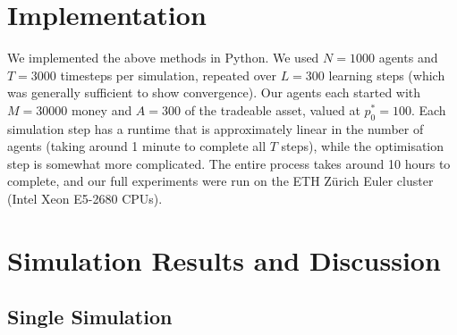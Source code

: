 \documentclass[11pt]{article}
\begin{document}
\section{Implementation}

We implemented the above methods in Python. We used $N=1000$ agents and $T=3000$ timesteps per simulation, repeated over $L=300$ learning steps (which was generally sufficient to show convergence). Our agents each started with $M=30000$ money and $A=300$ of the tradeable asset, valued at $p_0^*=100$. Each simulation step has a runtime that is approximately linear in the number of agents (taking around 1 minute to complete all $T$ steps), while the optimisation step is somewhat more complicated. The entire process takes around 10 hours to complete, and our full experiments were run on the ETH Z\"urich Euler cluster (Intel Xeon E5-2680 CPUs).

\section{Simulation Results and Discussion}

\subsection{Single Simulation}
\end{document}
